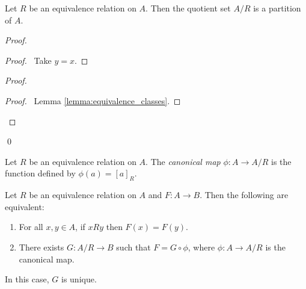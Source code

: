 \begin{theorem}
    Let $R$ be an equivalence relation on $A$. Then the quotient set $A / R$
    is a partition of $A$.
\end{theorem}

\begin{proof}
    \pf
    \begin{proof}
        \pf\ Take $y = x$.
    \end{proof}
    \begin{proof}
        \begin{proof}
            \pf\ Lemma \ref{lemma:equivalence_classes}.
        \end{proof}
    \end{proof}
    \qed
\end{proof}

\begin{definition}
    Let $R$ be an equivalence relation on $A$. The \emph{canonical map} $\phi : A \rightarrow A / R$
    is the function defined by $\phi(a) = [a]_R$.
\end{definition}

\begin{theorem}
    Let $R$ be an equivalence relation on $A$ and $F : A \rightarrow B$.
    Then the following are equivalent:
    \begin{enumerate}
        \item For all $x, y \in A$, if $xRy$ then $F(x) = F(y)$.
        \item There exists $G : A / R \rightarrow B$ such that 
        $F = G \circ \phi$, where $\phi : A \rightarrow A / R$ is the canonical map.
    \end{enumerate}
    In this case, $G$ is unique.
\end{theorem}

